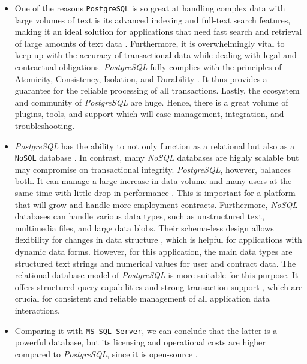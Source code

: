 \begin{itemize}
    \item One of the reasons \texttt{PostgreSQL} is so great at handling complex data with large volumes of text is its advanced indexing and full-text search features, making it an ideal solution for applications that need fast search and retrieval of large amounts of text data \cite{WorsleyEtAl2002}. Furthermore, it is overwhelmingly vital to keep up with the accuracy of transactional data while dealing with legal and contractual obligations. \textit{PostgreSQL} fully complies with the principles of Atomicity, Consistency, Isolation, and Durability \cite{JubaEtAl2015}. It thus provides a guarantee for the reliable processing of all transactions. Lastly, the ecosystem and community of \textit{PostgreSQL} are huge. Hence, there is a great volume of plugins, tools, and support \cite{FotacheEtAl2013} which will ease management, integration, and troubleshooting. 
    \item \textit{PostgreSQL} has the ability to not only function as a relational but also as a \texttt{NoSQL} database \cite{TruskowskiEtAl2020}. In contrast, many \textit{NoSQL} databases are highly scalable but may compromise on transactional integrity. \textit{PostgreSQL}, however, balances both. It can manage a large increase in data volume and many users at the same time with little drop in performance \cite{DouglasEtAl2003, TruskowskiEtAl2020, FotacheEtAl2013}. This is important for a platform that will grow and handle more employment contracts. Furthermore, \textit{NoSQL} databases can handle various data types, such as unstructured text, multimedia files, and large data blobs. Their schema-less design allows flexibility for changes in data structure \cite{FotacheEtAl2013}, which is helpful for applications with dynamic data forms. However, for this application, the main data types are structured text strings and numerical values for user and contract data. The relational database model of \textit{PostgreSQL} is more suitable for this purpose. It offers structured query capabilities and strong transaction support \cite{WorsleyEtAl2002, TruskowskiEtAl2020, FotacheEtAl2013}, which are crucial for consistent and reliable management of all application data interactions.
    \item Comparing it with \texttt{MS SQL Server}, we can conclude that the latter is a powerful database, but its licensing and operational costs are higher compared to \textit{PostgreSQL}, since it is open-source \cite{TruskowskiEtAl2020, FotacheEtAl2013}. 
\end{itemize}

